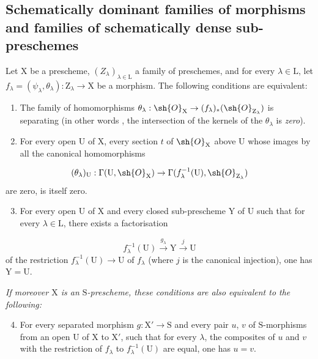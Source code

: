\subsection{Schematically dominant families of morphisms and families of schematically dense sub\mbox{-}preschemes}
\label{subsection:IV.11.10}

\begin{proposition}[11.10.1]
\label{IV.11.10.1}
Let $\mathrm{X}$ be a prescheme, $(Z_\lambda)_{\lambda\in\mathrm{L}}$ a family of preschemes, and for every $\lambda\in\mathrm{L}$, let $f_\lambda=(\psi_\lambda,\theta_\lambda):\mathrm{Z}_\lambda\to\mathrm{X}$ be a morphism.
The following conditions are equivalent:
\begin{enumerate}[label=\emph{\alph*)}]
  \item The family of homomorphisms $\theta_\lambda:\sh{O}_\mathrm{X}\to(f_\lambda)_*(\sh{O}_{\mathrm{Z}_\lambda})$ is separating (in other words , the intersection of the kernels of the $\theta_\lambda$ is \emph{zero}).
  \item For every open $\mathrm{U}$ of $\mathrm{X}$, every section $t$ of $\sh{O}_\mathrm{X}$ above $\mathrm{U}$ whose images by all the canonical homomorphisms
\end{enumerate}
\[
  (\theta_\lambda)_\mathrm{U}:\Gamma(\mathrm{U},\sh{O}_\mathrm{X})\to\Gamma(f_\lambda^{-1}(\mathrm{U}),\sh{O}_{\mathrm{Z}_\lambda})
\label{IV.11.10.1.1}
\]
are zero, is itself zero.
\begin{enumerate}[label=\emph{\alph*)}]
\setcounter{enumi}{2}
  \item For every open $\mathrm{U}$ of $\mathrm{X}$ and every closed sub-prescheme $\mathrm{Y}$ of $\mathrm{U}$ such that for every $\lambda\in\mathrm{L}$, there exists a factorisation
\end{enumerate}
\[
  f_\lambda^{-1}(\mathrm{U})\xrightarrow{g_\lambda}\mathrm{Y}\xrightarrow{j}\mathrm{U}
\label{IV.11.10.1.2}
\]
of the restriction $f_\lambda^{-1}(\mathrm{U})\to\mathrm{U}$ of $f_\lambda$ (where $j$ is the canonical injection), one has $\mathrm{Y}=\mathrm{U}$.

\emph{If moreover $\mathrm{X}$ is an $\mathrm{S}$-prescheme, these conditions are also equivalent to the following:}
\begin{enumerate}[label=\emph{\alph*)}]
\setcounter{enumi}{3}
  \item For every separated morphism $g:\mathrm{X}'\to\mathrm{S}$ and every pair $u$, $v$ of $\mathrm{S}$-morphisms from an open $\mathrm{U}$ of $\mathrm{X}$ to $\mathrm{X}'$, such that for every $\lambda$, the composites of $u$ and $v$ with the restriction of $f_\lambda$ to $f_\lambda^{-1}(\mathrm{U})$ are equal, one has $u=v$.
\end{enumerate}
\end{proposition}

